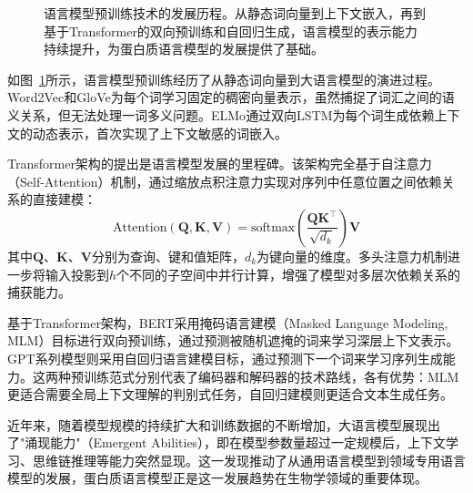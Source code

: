 \begin{figure}[htbp]
\caption{语言模型预训练技术的发展历程。从静态词向量到上下文嵌入，再到基于Transformer的双向预训练和自回归生成，语言模型的表示能力持续提升，为蛋白质语言模型的发展提供了基础。}
\label{fig:lm_evolution}
\end{figure}

如图~\ref{fig:lm_evolution}所示，语言模型预训练经历了从静态词向量到大语言模型的演进过程。Word2Vec\cite{mikolov2013efficient}和GloVe\cite{pennington2014glove}为每个词学习固定的稠密向量表示，虽然捕捉了词汇之间的语义关系，但无法处理一词多义问题。ELMo\cite{peters2018deep}通过双向LSTM为每个词生成依赖上下文的动态表示，首次实现了上下文敏感的词嵌入。

Transformer架构\cite{vaswani2017attention}的提出是语言模型发展的里程碑。该架构完全基于自注意力（Self-Attention）机制，通过缩放点积注意力实现对序列中任意位置之间依赖关系的直接建模：
\begin{equation}
\text{Attention}(\mathbf{Q}, \mathbf{K}, \mathbf{V}) = \text{softmax}\left(\frac{\mathbf{Q}\mathbf{K}^\top}{\sqrt{d_k}}\right)\mathbf{V}
\end{equation}
其中$\mathbf{Q}$、$\mathbf{K}$、$\mathbf{V}$分别为查询、键和值矩阵，$d_k$为键向量的维度。多头注意力机制进一步将输入投影到$h$个不同的子空间中并行计算，增强了模型对多层次依赖关系的捕获能力。

基于Transformer架构，BERT\cite{devlin2019bert}采用掩码语言建模（Masked Language Modeling, MLM）目标进行双向预训练，通过预测被随机遮掩的词来学习深层上下文表示。GPT系列模型\cite{radford2019language}则采用自回归语言建模目标，通过预测下一个词来学习序列生成能力。这两种预训练范式分别代表了编码器和解码器的技术路线，各有优势：MLM更适合需要全局上下文理解的判别式任务，自回归建模则更适合文本生成任务。

近年来，随着模型规模的持续扩大和训练数据的不断增加，大语言模型展现出了"涌现能力"（Emergent Abilities），即在模型参数量超过一定规模后，上下文学习、思维链推理等能力突然显现。这一发现推动了从通用语言模型到领域专用语言模型的发展，蛋白质语言模型正是这一发展趋势在生物学领域的重要体现。

